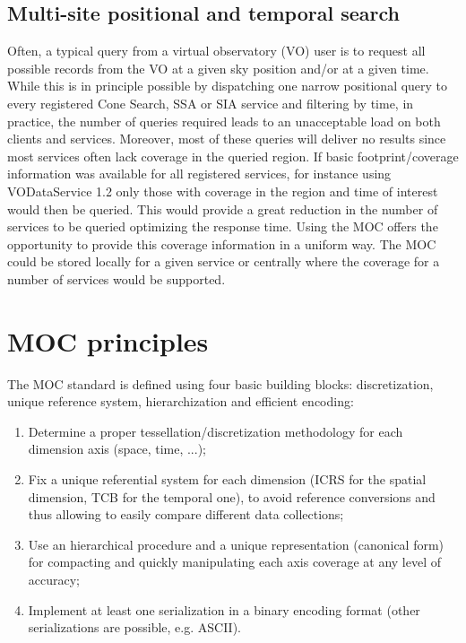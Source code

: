 \documentclass[11pt,a4paper]{ivoa}
\begin{document}
\subsection{Multi-site positional and temporal search}
Often, a typical query from a virtual observatory (VO) user is to
request all possible records from the VO at a given sky position
and/or at a given time. While this is in principle possible by
dispatching one narrow positional query to every registered Cone
Search, SSA or SIA service and filtering by time, in practice, the
number of queries required leads to an unacceptable load on both
clients and services. Moreover, most of these queries will deliver no
results since most services often lack coverage in the queried
region. If basic footprint/coverage information was available for all
registered services, for instance using VODataService 1.2
\citep{2021ivoa.spec.1102D} only those with coverage in the region
and time of interest would then be queried. This would provide a great
reduction in the number of services to be queried optimizing the
response time. Using the MOC offers the opportunity to provide this
coverage information in a uniform way. The MOC could be stored locally
for a given service or centrally where the coverage for a number of
services would be supported.


\section{MOC principles}

The MOC standard is defined using four basic building blocks:
discretization, unique reference system, hierarchization and efficient
encoding: 

\begin{enumerate}
\item Determine a proper tessellation/discretization methodology for
  each dimension axis (space, time, ...);
\item Fix a unique referential system for each dimension (ICRS for the
  spatial dimension, TCB for the temporal one), to avoid 
  reference conversions and thus allowing to easily compare different
  data collections; 
\item Use an hierarchical procedure and a unique representation
  (canonical form) for compacting and quickly manipulating each axis
  coverage at any level of accuracy;
\item Implement at least one serialization in a binary encoding format
  (other serializations are possible, e.g. ASCII). 
\end{enumerate} 
\end{document}
